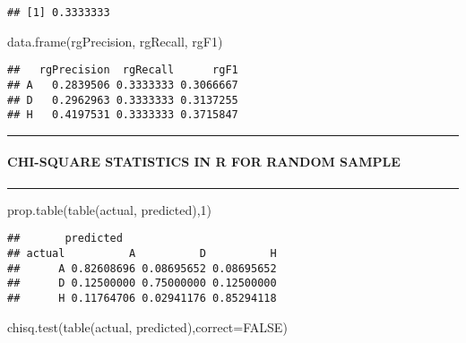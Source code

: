 \documentclass[
]{article}
\newenvironment{Shaded}{\begin{snugshade}}{\end{snugshade}}
\newcommand{\AttributeTok}[1]{\textcolor[rgb]{0.77,0.63,0.00}{#1}}
\newcommand{\ConstantTok}[1]{\textcolor[rgb]{0.00,0.00,0.00}{#1}}
\newcommand{\DecValTok}[1]{\textcolor[rgb]{0.00,0.00,0.81}{#1}}
\newcommand{\FunctionTok}[1]{\textcolor[rgb]{0.00,0.00,0.00}{#1}}
\newcommand{\NormalTok}[1]{#1}
\begin{document}
\begin{verbatim}
## [1] 0.3333333
\end{verbatim}

\begin{Shaded}
\begin{Highlighting}[]
\FunctionTok{data.frame}\NormalTok{(rgPrecision, rgRecall, rgF1)}
\end{Highlighting}
\end{Shaded}

\begin{verbatim}
##   rgPrecision  rgRecall      rgF1
## A   0.2839506 0.3333333 0.3066667
## D   0.2962963 0.3333333 0.3137255
## H   0.4197531 0.3333333 0.3715847
\end{verbatim}

\begin{center}\rule{0.5\linewidth}{0.5pt}\end{center}

\hypertarget{chi-square-statistics-in-r-for-random-sample}{%
\paragraph{\texorpdfstring{\textbf{CHI-SQUARE STATISTICS IN R FOR RANDOM
SAMPLE}}{CHI-SQUARE STATISTICS IN R FOR RANDOM SAMPLE}}\label{chi-square-statistics-in-r-for-random-sample}}

\begin{center}\rule{0.5\linewidth}{0.5pt}\end{center}

\begin{Shaded}
\begin{Highlighting}[]
\FunctionTok{prop.table}\NormalTok{(}\FunctionTok{table}\NormalTok{(actual, predicted),}\DecValTok{1}\NormalTok{)}
\end{Highlighting}
\end{Shaded}

\begin{verbatim}
##       predicted
## actual          A          D          H
##      A 0.82608696 0.08695652 0.08695652
##      D 0.12500000 0.75000000 0.12500000
##      H 0.11764706 0.02941176 0.85294118
\end{verbatim}

\begin{Shaded}
\begin{Highlighting}[]
\FunctionTok{chisq.test}\NormalTok{(}\FunctionTok{table}\NormalTok{(actual, predicted),}\AttributeTok{correct=}\ConstantTok{FALSE}\NormalTok{)}
\end{Highlighting}
\end{Shaded}
\end{document}
